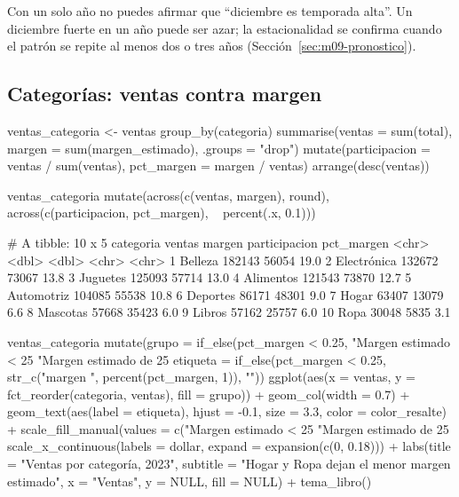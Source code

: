 \begin{advertencia}
Con un solo año no puedes afirmar que ``diciembre es temporada alta''. Un
diciembre fuerte en un año puede ser azar; la estacionalidad se confirma
cuando el patrón se repite al menos dos o tres años
(Sección~\ref{sec:m09-pronostico}).
\end{advertencia}

\subsection{Categorías: ventas contra margen}
\label{sec:m09-categorias}

\begin{rcode}
ventas_categoria <- ventas %
  group_by(categoria) %
  summarise(ventas = sum(total), margen = sum(margen_estimado),
            .groups = "drop") %
  mutate(participacion = ventas / sum(ventas),
         pct_margen    = margen / ventas) %
  arrange(desc(ventas))

ventas_categoria %
  mutate(across(c(ventas, margen), round),
         across(c(participacion, pct_margen), ~ percent(.x, 0.1)))
\end{rcode}

\begin{rsalida}
# A tibble: 10 x 5
   categoria   ventas margen participacion pct_margen
   <chr>        <dbl>  <dbl> <chr>         <chr>     
 1 Belleza     182143  56054 19.0%
 2 Electrónica 132672  73067 13.8%
 3 Juguetes    125093  57714 13.0%
 4 Alimentos   121543  73870 12.7%
 5 Automotriz  104085  55538 10.8%
 6 Deportes     86171  48301 9.0%
 7 Hogar        63407  13079 6.6%
 8 Mascotas     57668  35423 6.0%
 9 Libros       57162  25757 6.0%
10 Ropa         30048   5835 3.1%
\end{rsalida}

\begin{rcode}
ventas_categoria %
  mutate(grupo = if_else(pct_margen < 0.25, "Margen estimado < 25%
                         "Margen estimado de 25%
         etiqueta = if_else(pct_margen < 0.25,
                            str_c("margen ", percent(pct_margen, 1)), "")) %
  ggplot(aes(x = ventas, y = fct_reorder(categoria, ventas),
             fill = grupo)) +
  geom_col(width = 0.7) +
  geom_text(aes(label = etiqueta), hjust = -0.1, size = 3.3,
            color = color_resalte) +
  scale_fill_manual(values = c("Margen estimado < 25%
                               "Margen estimado de 25%
  scale_x_continuous(labels = dollar, expand = expansion(c(0, 0.18))) +
  labs(title = "Ventas por categoría, 2023",
       subtitle = "Hogar y Ropa dejan el menor margen estimado",
       x = "Ventas", y = NULL, fill = NULL) +
  tema_libro()
\end{rcode}

